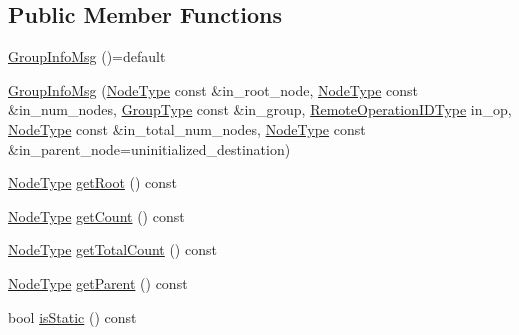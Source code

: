\subsection*{Public Member Functions}
\begin{DoxyCompactItemize}
\item 
\hyperlink{structvt_1_1group_1_1_group_info_msg_a2b815dd4e8e961d04e3c118f486acf18}{Group\+Info\+Msg} ()=default
\item 
\hyperlink{structvt_1_1group_1_1_group_info_msg_a8d7363206ca034b3f3f45b790c6ecf35}{Group\+Info\+Msg} (\hyperlink{namespacevt_a866da9d0efc19c0a1ce79e9e492f47e2}{Node\+Type} const \&in\+\_\+root\+\_\+node, \hyperlink{namespacevt_a866da9d0efc19c0a1ce79e9e492f47e2}{Node\+Type} const \&in\+\_\+num\+\_\+nodes, \hyperlink{namespacevt_a27b5e4411c9b6140c49100e050e2f743}{Group\+Type} const \&in\+\_\+group, \hyperlink{namespacevt_1_1group_a73f2624ddeb535b39a08b6524f26b244}{Remote\+Operation\+I\+D\+Type} in\+\_\+op, \hyperlink{namespacevt_a866da9d0efc19c0a1ce79e9e492f47e2}{Node\+Type} const \&in\+\_\+total\+\_\+num\+\_\+nodes, \hyperlink{namespacevt_a866da9d0efc19c0a1ce79e9e492f47e2}{Node\+Type} const \&in\+\_\+parent\+\_\+node=uninitialized\+\_\+destination)
\item 
\hyperlink{namespacevt_a866da9d0efc19c0a1ce79e9e492f47e2}{Node\+Type} \hyperlink{structvt_1_1group_1_1_group_info_msg_a9c7a80de634653780f854d80a2b3cc7c}{get\+Root} () const
\item 
\hyperlink{namespacevt_a866da9d0efc19c0a1ce79e9e492f47e2}{Node\+Type} \hyperlink{structvt_1_1group_1_1_group_info_msg_af2b70c6fd25cf88a0901498fab9cf5a3}{get\+Count} () const
\item 
\hyperlink{namespacevt_a866da9d0efc19c0a1ce79e9e492f47e2}{Node\+Type} \hyperlink{structvt_1_1group_1_1_group_info_msg_ae344bd8126dfc617429cb4f887be7d34}{get\+Total\+Count} () const
\item 
\hyperlink{namespacevt_a866da9d0efc19c0a1ce79e9e492f47e2}{Node\+Type} \hyperlink{structvt_1_1group_1_1_group_info_msg_a46affd5f499b8de1336c21f7e044b4d2}{get\+Parent} () const
\item 
bool \hyperlink{structvt_1_1group_1_1_group_info_msg_a9b59ffc275041b6a04c4aa61f10b4f79}{is\+Static} () const
\end{DoxyCompactItemize}
